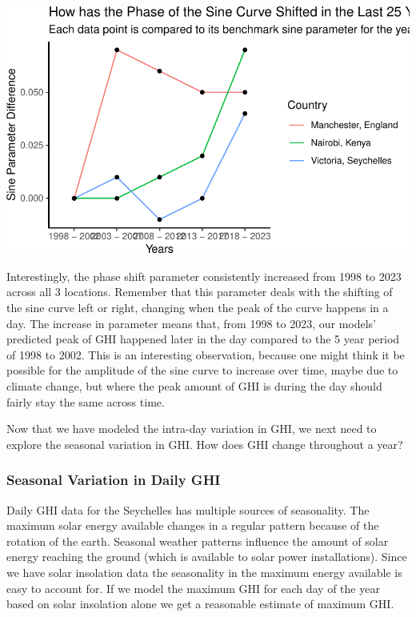 \documentclass[
  letterpaper,
  DIV=11,
  numbers=noendperiod]{scrartcl}
\begin{document}
\includegraphics{FinalReport_files/figure-pdf/unnamed-chunk-9-1.pdf}

Interestingly, the phase shift parameter consistently increased from
1998 to 2023 across all 3 locations. Remember that this parameter deals
with the shifting of the sine curve left or right, changing when the
peak of the curve happens in a day. The increase in parameter means
that, from 1998 to 2023, our models' predicted peak of GHI happened
later in the day compared to the 5 year period of 1998 to 2002. This is
an interesting observation, because one might think it be possible for
the amplitude of the sine curve to increase over time, maybe due to
climate change, but where the peak amount of GHI is during the day
should fairly stay the same across time.

Now that we have modeled the intra-day variation in GHI, we next need to
explore the seasonal variation in GHI. How does GHI change throughout a
year?

\hypertarget{seasonal-variation-in-daily-ghi}{%
\subsubsection{Seasonal Variation in Daily
GHI}\label{seasonal-variation-in-daily-ghi}}

Daily GHI data for the Seychelles has multiple sources of seasonality.
The maximum solar energy available changes in a regular pattern because
of the rotation of the earth. Seasonal weather patterns influence the
amount of solar energy reaching the ground (which is available to solar
power installations). Since we have solar insolation data the
seasonality in the maximum energy available is easy to account for. If
we model the maximum GHI for each day of the year based on solar
insolation alone we get a reasonable estimate of maximum GHI.
\end{document}

